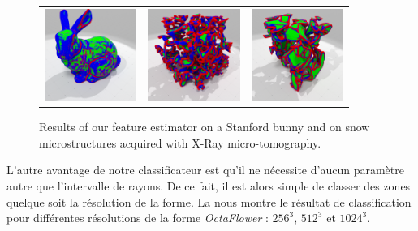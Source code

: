 \begin{figure}[ht]
  \begin{center}
    \setlength{\tabcolsep}{1pt}
    \begin{tabular}{c c c}
      \includegraphics[width=3cm]{images/Feature/Bunny_512_II_scale} &
      \includegraphics[width=3cm]{images/Feature/Snow_I08_II_scale} &
      \includegraphics[width=3cm]{images/Feature/Snow_E2bis_II_scale} \\
    \end{tabular}
    \caption{Results of our feature estimator on a Stanford bunny and on snow microstructures acquired with X-Ray micro-tomography.\label{fig:feature-snow}}
  \end{center}
\end{figure}

L'autre avantage de notre classificateur est qu'il ne nécessite d'aucun paramètre autre que l'intervalle de rayons. De ce fait, il est alors simple de classer des zones quelque soit la résolution de la forme. La  nous montre le résultat de classification pour différentes résolutions de la forme \emph{OctaFlower} : $256^3$, $512^3$ et $1024^3$.

